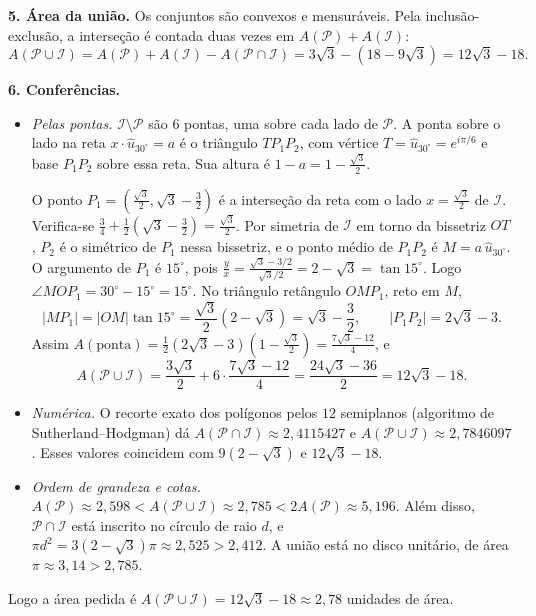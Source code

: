 \documentclass{article}%
\begin{document}
\textbf{5. Área da união.} Os conjuntos são convexos e mensuráveis. Pela inclusão-exclusão, a interseção é contada duas vezes em $A(\mathcal P)+A(\mathcal I)$:
\[
A(\mathcal P\cup\mathcal I)=A(\mathcal P)+A(\mathcal I)-A(\mathcal P\cap\mathcal I)=3\sqrt3-\left(18-9\sqrt3\right)=12\sqrt3-18.
\]

\textbf{6. Conferências.}
\begin{itemize}
\item \emph{Pelas pontas.} $\mathcal I\setminus\mathcal P$ são $6$ pontas, uma sobre cada lado de $\mathcal P$. A ponta sobre o lado na reta $x\cdot\hat u_{30^\circ}=a$ é o triângulo $TP_1P_2$, com vértice $T=\hat u_{30^\circ}=e^{i\pi/6}$ e base $P_1P_2$ sobre essa reta. Sua altura é $1-a=1-\frac{\sqrt3}{2}$.

O ponto $P_1=\left(\frac{\sqrt3}{2},\sqrt3-\frac32\right)$ é a interseção da reta com o lado $x=\frac{\sqrt3}{2}$ de $\mathcal I$. Verifica-se $\frac34+\frac12\left(\sqrt3-\frac32\right)=\frac{\sqrt3}{2}$. Por simetria de $\mathcal I$ em torno da bissetriz $OT$, $P_2$ é o simétrico de $P_1$ nessa bissetriz, e o ponto médio de $P_1P_2$ é $M=a\,\hat u_{30^\circ}$. O argumento de $P_1$ é $15^\circ$, pois $\frac{y}{x}=\frac{\sqrt3-3/2}{\sqrt3/2}=2-\sqrt3=\tan15^\circ$. Logo $\angle MOP_1=30^\circ-15^\circ=15^\circ$. No triângulo retângulo $OMP_1$, reto em $M$,
\[
|MP_1|=|OM|\tan15^\circ=\frac{\sqrt3}{2}(2-\sqrt3)=\sqrt3-\frac32,\qquad |P_1P_2|=2\sqrt3-3.
\]
Assim $A(\text{ponta})=\frac12(2\sqrt3-3)\left(1-\frac{\sqrt3}{2}\right)=\frac{7\sqrt3-12}{4}$, e
\[
A(\mathcal P\cup\mathcal I)=\frac{3\sqrt3}{2}+6\cdot\frac{7\sqrt3-12}{4}=\frac{24\sqrt3-36}{2}=12\sqrt3-18.
\]

\item \emph{Numérica.} O recorte exato dos polígonos pelos $12$ semiplanos (algoritmo de Sutherland–Hodgman) dá $A(\mathcal P\cap\mathcal I)\approx 2{,}4115427$ e $A(\mathcal P\cup\mathcal I)\approx 2{,}7846097$. Esses valores coincidem com $9(2-\sqrt3)$ e $12\sqrt3-18$.

\item \emph{Ordem de grandeza e cotas.} $A(\mathcal P)\approx 2{,}598<A(\mathcal P\cup\mathcal I)\approx 2{,}785<2A(\mathcal P)\approx 5{,}196$. Além disso, $\mathcal P\cap\mathcal I$ está inscrito no círculo de raio $d$, e $\pi d^2=3(2-\sqrt3)\pi\approx 2{,}525>2{,}412$. A união está no disco unitário, de área $\pi\approx 3{,}14>2{,}785$.
\end{itemize}

Logo a área pedida é $A(\mathcal P\cup\mathcal I)=12\sqrt3-18\approx 2{,}78$ unidades de área.
\end{document}
